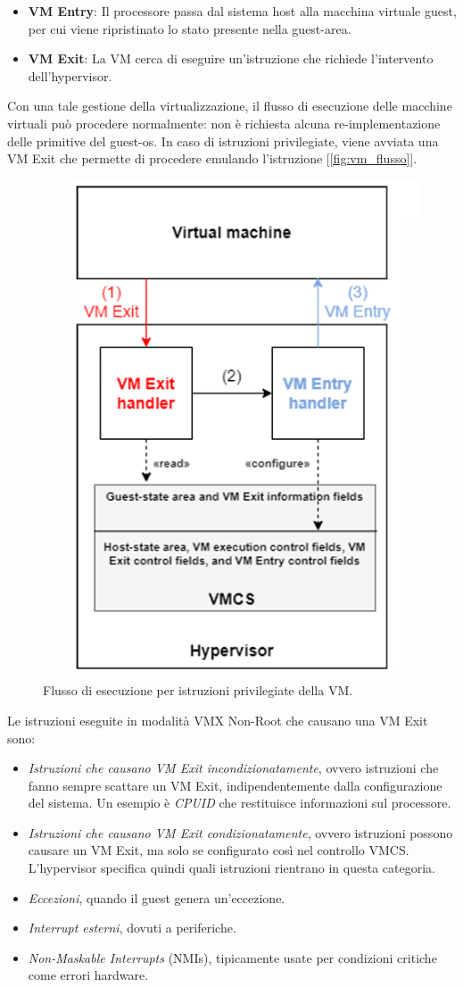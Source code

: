 \begin{itemize}
    \item \textbf{VM Entry}: Il processore passa dal sistema host alla macchina virtuale guest, per cui viene ripristinato lo stato presente nella guest-area.
    \item \textbf{VM Exit}: La VM cerca di eseguire un'istruzione che richiede l’intervento dell’hypervisor.
\end{itemize}
Con una tale gestione della virtualizzazione, il flusso di esecuzione delle macchine virtuali può procedere normalmente: non è richiesta alcuna re-implementazione delle primitive del guest-os. In caso di istruzioni privilegiate, viene avviata una VM Exit che permette di procedere emulando l'istruzione [\ref{fig:vm_flusso}].
\begin{figure}[!h]
	\centering
	\includegraphics[width=0.45\linewidth]{img/vm-flusso}
	\caption{Flusso di esecuzione per istruzioni privilegiate della VM.}
	\label{fig:vm-flusso}
\end{figure}
Le istruzioni eseguite in modalità VMX Non-Root che causano una VM Exit sono:
\begin{itemize}
	\item \textit{Istruzioni che causano VM Exit incondizionatamente}, ovvero istruzioni che fanno sempre scattare un VM Exit, indipendentemente dalla configurazione del sistema. Un esempio è \textit{CPUID} che restituisce informazioni sul processore.
	\item \textit{Istruzioni che causano VM Exit condizionatamente}, ovvero istruzioni possono causare un VM Exit, ma solo se configurato così nel controllo VMCS. L'hypervisor specifica quindi quali istruzioni rientrano in questa categoria.
	\item \textit{Eccezioni}, quando il guest genera un’eccezione.
	\item \textit{Interrupt esterni}, dovuti a periferiche.
	\item \textit{Non-Maskable Interrupts} (NMIs), tipicamente usate per condizioni critiche come errori hardware.
\end{itemize}
